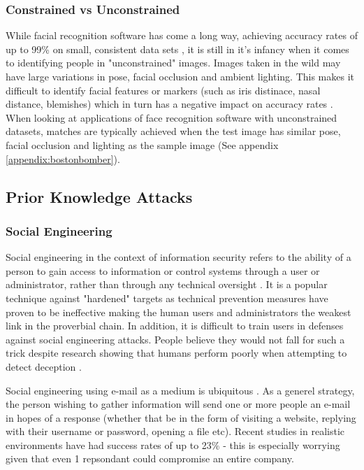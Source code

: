 \documentclass[12pt]{article}
\begin{document}
\subsubsection{Constrained vs Unconstrained}
While facial recognition software has come a long way, achieving accuracy rates of up to 99\% on small, consistent data sets \citep{facialrecogidentifyingpoi}, it is still in it's infancy when it comes to identifying people in "unconstrained" images. Images taken in the wild may have large variations in pose, facial occlusion and ambient lighting. This makes it difficult to identify facial features or markers (such as iris distinace, nasal distance, blemishes) which in turn has a negative impact on accuracy rates \citep{unconstrainedfacialrecogbenchmark}. When looking at applications of face recognition software with unconstrained datasets, matches are typically achieved when the test image has similar pose, facial occlusion and lighting as the sample image (See appendix \ref{appendix:bostonbomber}).

\subsection{Prior Knowledge Attacks}
\subsubsection{Social Engineering}
Social engineering in the context of information security refers to the ability of a person to gain access to information or control systems through a user or administrator, rather than through any technical oversight \citep{socialengineeringvulnerabilites}. It is a popular technique against "hardened" targets as technical prevention measures have proven to be ineffective \citep{advancedsocialengineering} making the human users and administrators the weakest link in the proverbial chain. In addition, it is difficult to train users in defenses against social engineering attacks. People believe they would not fall for such a trick despite research showing that humans perform poorly when attempting to detect deception \citep{advancedsocialengineering}\citep{socialengineeringvulnerabilites}. 

Social engineering using e-mail as a medium is ubiquitous \citep{socialengineeringvulnerabilites}. As a generel strategy, the person wishing to gather information will send one or more people an e-mail in hopes of a response (whether that be in the form of visiting a website, replying with their username or password, opening a file etc). Recent studies in realistic environments have had success rates of up to 23\% \citep{socialengineeringvulnerabilites} - this is especially worrying given that even 1 repsondant could compromise an entire company.
\end{document}
